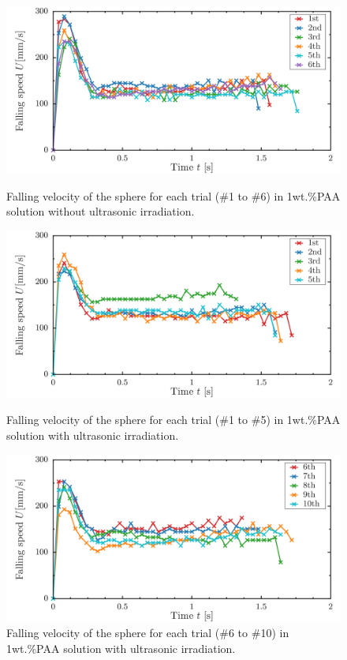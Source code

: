 \begin{figure}[ht]
    \centering
    \includegraphics[width=12cm,clip]{X-Appendix/1-5.png}
    \caption{Falling velocity of the sphere for each trial (\#1 to \#6) in 1wt.\%PAA solution without ultrasonic irradiation.}
    \label{fig:1-2PAA-falling1-5}
    \centering
    \includegraphics[width=12cm,clip]{X-Appendix/1-5-2.png}
    \caption{Falling velocity of the sphere for each trial (\#1 to \#5) in 1wt.\%PAA solution with ultrasonic irradiation.}
    \label{fig:1-2onPAA-falling1-5}
    \centering
    \includegraphics[width=12cm,clip]{X-Appendix/6-10.png}
    \caption{Falling velocity of the sphere for each trial (\#6 to \#10) in 1wt.\%PAA solution with ultrasonic irradiation.}
    \label{fig:1-2onPAA-falling6-10}
\end{figure}
